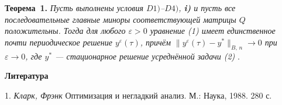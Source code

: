 \textbf{Теорема~1.} {\it Пусть выполнены условия  $D1)$--$D4)$, \textbf{i)} и пусть все последовательные главные миноры соответствующей матрицы $Q$ положительны. Тогда для любого $\varepsilon >0$ уравнение (1) имеет единственное почти периодическое решение $y^\varepsilon(\tau)$, причём ${\|y^\varepsilon(\tau)-y^*\|_{B,\, n}\rightarrow 0}$ при $\varepsilon\rightarrow 0$, где $y^*$ --- стационарное решение усреднённой задачи (2)} .


\smallskip \centerline{\bf Литература}\nopagebreak

1. {\it Кларк, Фрэнк} Оптимизация и негладкий анализ. М.: Наука, 1988. 280 с.

